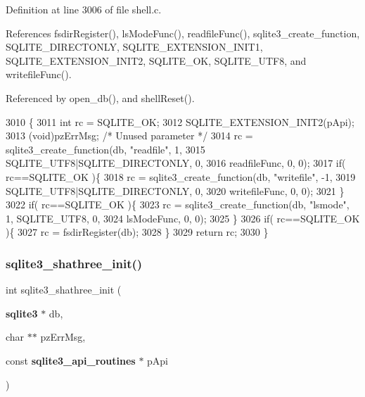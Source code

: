 Definition at line 3006 of file shell.\+c.



References fsdir\+Register(), ls\+Mode\+Func(), readfile\+Func(), sqlite3\+\_\+create\+\_\+function, S\+Q\+L\+I\+T\+E\+\_\+\+D\+I\+R\+E\+C\+T\+O\+N\+LY, S\+Q\+L\+I\+T\+E\+\_\+\+E\+X\+T\+E\+N\+S\+I\+O\+N\+\_\+\+I\+N\+I\+T1, S\+Q\+L\+I\+T\+E\+\_\+\+E\+X\+T\+E\+N\+S\+I\+O\+N\+\_\+\+I\+N\+I\+T2, S\+Q\+L\+I\+T\+E\+\_\+\+OK, S\+Q\+L\+I\+T\+E\+\_\+\+U\+T\+F8, and writefile\+Func().



Referenced by open\+\_\+db(), and shell\+Reset().


\begin{DoxyCode}
3010  \{
3011   \textcolor{keywordtype}{int} rc = SQLITE_OK;
3012   SQLITE_EXTENSION_INIT2(pApi);
3013   (void)pzErrMsg;  \textcolor{comment}{/* Unused parameter */}
3014   rc = sqlite3_create_function(db, \textcolor{stringliteral}{"readfile"}, 1, 
3015                                SQLITE_UTF8|SQLITE_DIRECTONLY, 0,
3016                                readfileFunc, 0, 0);
3017   \textcolor{keywordflow}{if}( rc==SQLITE_OK )\{
3018     rc = sqlite3_create_function(db, \textcolor{stringliteral}{"writefile"}, -1,
3019                                  SQLITE_UTF8|SQLITE_DIRECTONLY, 0,
3020                                  writefileFunc, 0, 0);
3021   \}
3022   \textcolor{keywordflow}{if}( rc==SQLITE_OK )\{
3023     rc = sqlite3_create_function(db, \textcolor{stringliteral}{"lsmode"}, 1, SQLITE_UTF8, 0,
3024                                  lsModeFunc, 0, 0);
3025   \}
3026   \textcolor{keywordflow}{if}( rc==SQLITE_OK )\{
3027     rc = fsdirRegister(db);
3028   \}
3029   \textcolor{keywordflow}{return} rc;
3030 \}
\end{DoxyCode}
\mbox{\label{shell_8c_a81f604b1ca3c2a65d392abb47ac4cff2}} 
\subsubsection{sqlite3\+\_\+shathree\+\_\+init()}
{\footnotesize\ttfamily int sqlite3\+\_\+shathree\+\_\+init (\begin{DoxyParamCaption}\item[{\textbf{ sqlite3} $\ast$}]{db,  }\item[{char $\ast$$\ast$}]{pz\+Err\+Msg,  }\item[{const \textbf{ sqlite3\+\_\+api\+\_\+routines} $\ast$}]{p\+Api }\end{DoxyParamCaption})}



